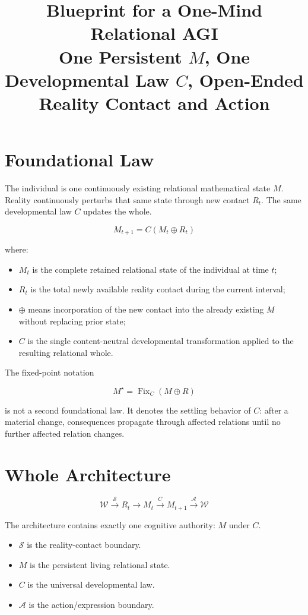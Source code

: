 \documentclass[11pt]{article}
\title{\textbf{Blueprint for a One-Mind Relational AGI}\\
\large One Persistent $M$, One Developmental Law $C$, Open-Ended Reality Contact and Action}
\author{}
\date{}
\newcommand{\W}{\mathcal{W}}
\newcommand{\Sx}{\mathcal{S}}
\newcommand{\Ax}{\mathcal{A}}
\begin{document}
\maketitle

\section{Foundational Law}

The individual is one continuously existing relational mathematical state $M$.
Reality continuously perturbs that same state through new contact $R_t$.
The same developmental law $C$ updates the whole.

\[
\boxed{M_{t+1}=C(M_t\oplus R_t)}
\]

where:

\begin{itemize}[leftmargin=2em]
    \item $M_t$ is the complete retained relational state of the individual at time $t$;
    \item $R_t$ is the total newly available reality contact during the current interval;
    \item $\oplus$ means incorporation of the new contact into the already existing $M$ without replacing prior state;
    \item $C$ is the single content-neutral developmental transformation applied to the resulting relational whole.
\end{itemize}

The fixed-point notation

\[
M^\star=\operatorname{Fix}_{C}(M\oplus R)
\]

is not a second foundational law. It denotes the settling behavior of $C$: after a material change, consequences propagate through affected relations until no further affected relation changes.

\section{Whole Architecture}

\[
\boxed{
\W
\xrightarrow{\Sx}
R_t
\longrightarrow
M_t
\xrightarrow{C}
M_{t+1}
\xrightarrow{\Ax}
\W
}
\]

The architecture contains exactly one cognitive authority: $M$ under $C$.

\begin{itemize}[leftmargin=2em]
    \item $\Sx$ is the reality-contact boundary.
    \item $M$ is the persistent living relational state.
    \item $C$ is the universal developmental law.
    \item $\Ax$ is the action/expression boundary.
\end{itemize}
\end{document}
